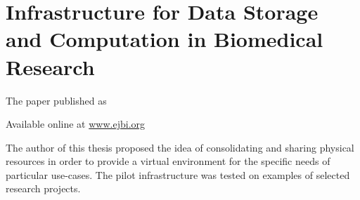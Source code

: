 \chapter{Infrastructure for Data Storage and Computation in Biomedical Research}\label{app:infrastructure}
The paper \cite{kulhanek2010c} published as
 

Available online at \href{http://www.ejbi.org/en/ejbi/article/49-en-infrastructure-for-data-storage-and-computation-in-biomedical-research.html}{www.ejbi.org}

The author of this thesis proposed the idea of consolidating and sharing physical resources in order to provide a virtual environment for the specific needs of particular use-cases. The pilot infrastructure was tested on examples of selected research projects.

%